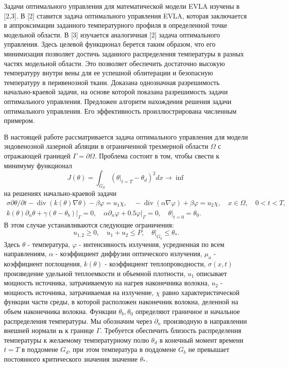 \documentclass[10pt]{article}
\begin{document}
    Задачи оптимального управления для математической модели EVLA изучены в [2,3].
    В [2] ставится задача оптимального управления EVLA, которая заключается в
    аппроксимации заданного температурного профиля в определенной точке модельной области.
    В [3] изучается аналогичная [2] задача оптимального управления.
    Здесь целевой функционал берется таким образом, что его минимизация позволяет достичь
    заданного распределения температуры в разных частях модельной области.
    Это позволяет обеспечить достаточно высокую температуру внутри вены для ее успешной
    облитерации и безопасную температуру в перивенозной ткани.
    Доказана однозначная разрешимость начально-краевой задачи,
    на основе которой показана разрешимость задачи оптимального управления.
    Предложен алгоритм нахождения решения задачи оптимального управления.
    Его эффективность проиллюстрирована численным примером.


    В настоящей работе рассматривается задача оптимального управления для модели
    эндовенозной лазерной абляции в ограниченной трехмерной области
    $\Omega$ с отражающей границей $\Gamma=\partial\Omega$.
    Проблема состоит в том, чтобы свести к минимуму функционал
    \[
        J(\theta)=\int_{G_{d}}\left(\left.\theta\right|_{t=T}-\theta_{d}\right)^{2} d x \rightarrow \inf
    \]
    на решениях начально-краевой задачи
    \[
        \begin{gathered}
            \sigma \partial \theta / \partial t-\operatorname{div}(k(\theta) \nabla \theta)-\beta \varphi=u_{1} \chi, \quad-\operatorname{div}(\alpha \nabla \varphi)+\beta \varphi=u_{2} \chi, \quad x \in \Omega, \quad 0<t<T, \\
            k(\theta) \partial_{n} \theta+\left.\gamma\left(\theta-\theta_{b}\right)\right|_{\Gamma}=0, \quad \alpha \partial_{n} \varphi+\left.0.5 \varphi\right|_{\Gamma}=0,\left.\quad \theta\right|_{t=0}=\theta_{0} .
        \end{gathered}
    \]
    В этом случае устанавливаются следующие ограничения:
    \[
        u_{1,2} \geq 0, \quad u_{1}+u_{2} \leq P,\left.\quad \theta\right|_{G_{b}} \leq \theta_{*} .
    \]
    Здесь $\theta$ - температура, $\varphi$ - интенсивность излучения, усредненная по всем направлениям,
    $\alpha$ - коэффициент диффузии оптического излучения, $\mu_{a}$ - коэффициент поглощения,
    $k(\theta)$ - коэффициент теплопроводности, $\sigma(x, t)$ произведение удельной теплоемкости
    и объемной плотности, $u_{1}$ описывает мощность источника, затрачиваемую
    на нагрев наконечника волокна, $u_{2}$ - мощность источника, затрачиваемая на излучение,
    $\chi$ равно характеристической функции части среды, в которой расположен наконечник волокна,
    деленной на объем наконечника волокна.
    Функции $\theta_{b}, \theta_{0}$ определяют граничное и начальное распределения температуры.
    Мы обозначим через $\partial_{n}$ производную в направлении внешней нормали $\mathbf{n}$ к границе $\Gamma$.
    Требуется обеспечить близость распределения температуры к желаемому температурному полю $\theta_{d}$
    в конечный момент времени $t=T$ в поддомене $G_{d}$, при этом температура в поддомене $G_{b}$
    не превышает постоянного критического значения значение $\theta_{*}$.
\end{document}

